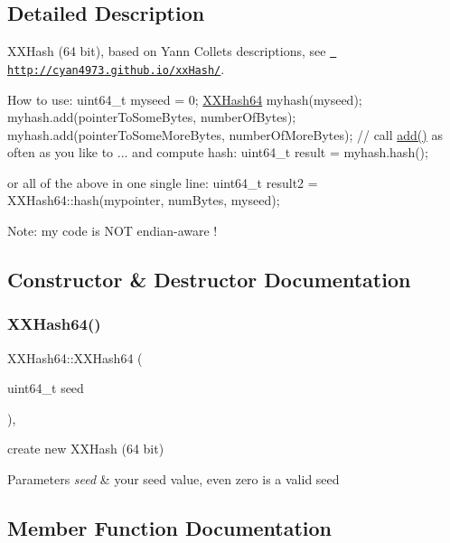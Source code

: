\subsection{Detailed Description}
X\+X\+Hash (64 bit), based on Yann Collet\textquotesingle{}s descriptions, see \href{http://cyan4973.github.io/xxHash/}{\texttt{ http\+://cyan4973.\+github.\+io/xx\+Hash/}}. 

How to use\+: uint64\+\_\+t myseed = 0; \mbox{\hyperlink{class_x_x_hash64}{X\+X\+Hash64}} myhash(myseed); myhash.\+add(pointer\+To\+Some\+Bytes,     number\+Of\+Bytes); myhash.\+add(pointer\+To\+Some\+More\+Bytes, number\+Of\+More\+Bytes); // call \mbox{\hyperlink{class_x_x_hash64_a150f41ac12eacc49e98b4847e70c871a}{add()}} as often as you like to ... and compute hash\+: uint64\+\_\+t result = myhash.\+hash();

or all of the above in one single line\+: uint64\+\_\+t result2 = X\+X\+Hash64\+::hash(mypointer, num\+Bytes, myseed);

Note\+: my code is N\+OT endian-\/aware ! 

\subsection{Constructor \& Destructor Documentation}
\mbox{\label{class_x_x_hash64_a75750aa9da0608c510cb2770db35754b}} 
\subsubsection{\texorpdfstring{XXHash64()}{XXHash64()}}
{\footnotesize\ttfamily X\+X\+Hash64\+::\+X\+X\+Hash64 (\begin{DoxyParamCaption}\item[{uint64\+\_\+t}]{seed }\end{DoxyParamCaption})\hspace{0.3cm}{\ttfamily [inline]}, {\ttfamily [explicit]}}



create new X\+X\+Hash (64 bit) 


\begin{DoxyParams}{Parameters}
{\em seed} & your seed value, even zero is a valid seed \\
\hline
\end{DoxyParams}


\subsection{Member Function Documentation}
\mbox{\label{class_x_x_hash64_a150f41ac12eacc49e98b4847e70c871a}} 
